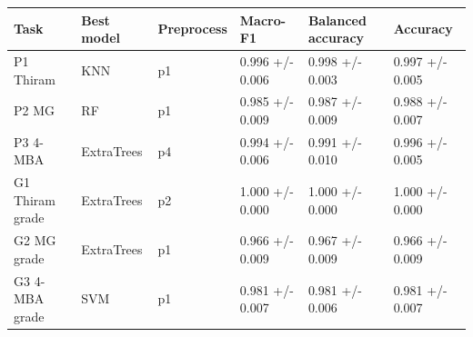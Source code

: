 \begin{tabular}{llllll}
\toprule
Task & Best model & Preprocess & Macro-F1 & Balanced accuracy & Accuracy \\
\midrule
P1 Thiram & KNN & p1 & 0.996 +/- 0.006 & 0.998 +/- 0.003 & 0.997 +/- 0.005 \\
P2 MG & RF & p1 & 0.985 +/- 0.009 & 0.987 +/- 0.009 & 0.988 +/- 0.007 \\
P3 4-MBA & ExtraTrees & p4 & 0.994 +/- 0.006 & 0.991 +/- 0.010 & 0.996 +/- 0.005 \\
G1 Thiram grade & ExtraTrees & p2 & 1.000 +/- 0.000 & 1.000 +/- 0.000 & 1.000 +/- 0.000 \\
G2 MG grade & ExtraTrees & p1 & 0.966 +/- 0.009 & 0.967 +/- 0.009 & 0.966 +/- 0.009 \\
G3 4-MBA grade & SVM & p1 & 0.981 +/- 0.007 & 0.981 +/- 0.006 & 0.981 +/- 0.007 \\
\bottomrule
\end{tabular}
